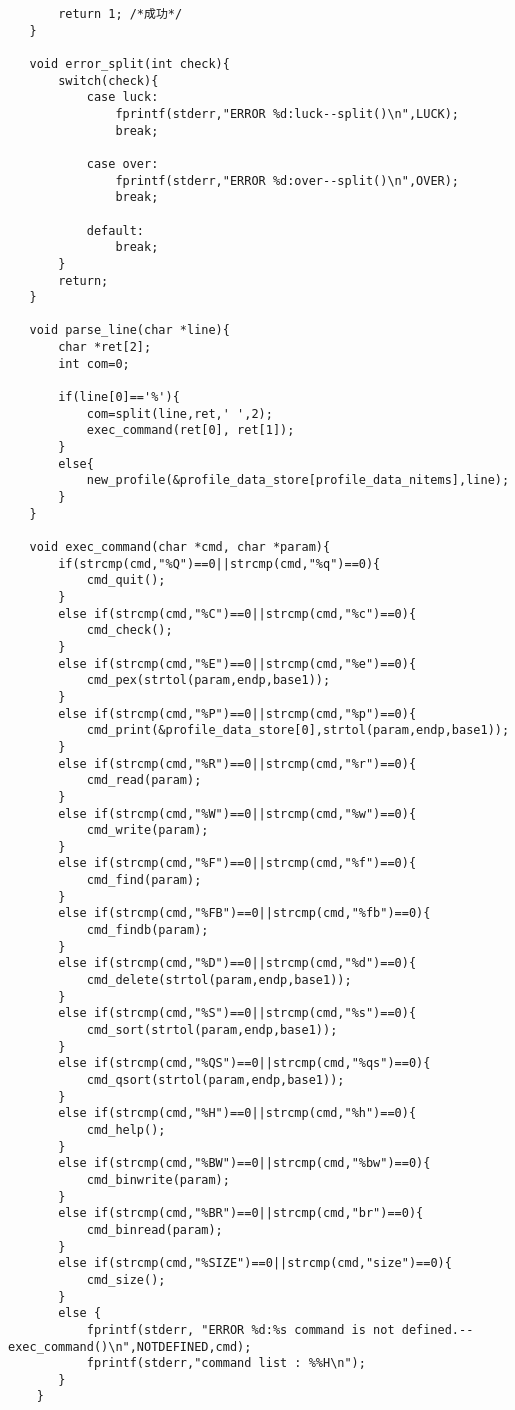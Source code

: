 \documentclass[a4j,11pt]{jarticle}
\begin{document}
\begin{lstlisting}
       return 1; /*成功*/
   }
   
   void error_split(int check){
       switch(check){
           case luck:
               fprintf(stderr,"ERROR %d:luck--split()\n",LUCK);
               break;
           
           case over:
               fprintf(stderr,"ERROR %d:over--split()\n",OVER);
               break;
           
           default:
               break;
       }
       return;
   }
   
   void parse_line(char *line){
       char *ret[2];
       int com=0;
       
       if(line[0]=='%'){
           com=split(line,ret,' ',2);
           exec_command(ret[0], ret[1]);
       }
       else{
           new_profile(&profile_data_store[profile_data_nitems],line);
       }
   }
   
   void exec_command(char *cmd, char *param){
       if(strcmp(cmd,"%Q")==0||strcmp(cmd,"%q")==0){
           cmd_quit();
       }
       else if(strcmp(cmd,"%C")==0||strcmp(cmd,"%c")==0){
           cmd_check();
       }
       else if(strcmp(cmd,"%E")==0||strcmp(cmd,"%e")==0){
           cmd_pex(strtol(param,endp,base1));
       }
       else if(strcmp(cmd,"%P")==0||strcmp(cmd,"%p")==0){
           cmd_print(&profile_data_store[0],strtol(param,endp,base1));
       }
       else if(strcmp(cmd,"%R")==0||strcmp(cmd,"%r")==0){
           cmd_read(param);
       }
       else if(strcmp(cmd,"%W")==0||strcmp(cmd,"%w")==0){
           cmd_write(param);
       }
       else if(strcmp(cmd,"%F")==0||strcmp(cmd,"%f")==0){
           cmd_find(param);
       }
       else if(strcmp(cmd,"%FB")==0||strcmp(cmd,"%fb")==0){
           cmd_findb(param);
       }
       else if(strcmp(cmd,"%D")==0||strcmp(cmd,"%d")==0){
           cmd_delete(strtol(param,endp,base1));
       }
       else if(strcmp(cmd,"%S")==0||strcmp(cmd,"%s")==0){
           cmd_sort(strtol(param,endp,base1));
       }
       else if(strcmp(cmd,"%QS")==0||strcmp(cmd,"%qs")==0){
           cmd_qsort(strtol(param,endp,base1));
       }
       else if(strcmp(cmd,"%H")==0||strcmp(cmd,"%h")==0){
           cmd_help();
       }
       else if(strcmp(cmd,"%BW")==0||strcmp(cmd,"%bw")==0){
           cmd_binwrite(param);
       }
       else if(strcmp(cmd,"%BR")==0||strcmp(cmd,"br")==0){
           cmd_binread(param);
       }
       else if(strcmp(cmd,"%SIZE")==0||strcmp(cmd,"size")==0){
           cmd_size();
       }
       else {
           fprintf(stderr, "ERROR %d:%s command is not defined.--exec_command()\n",NOTDEFINED,cmd);
           fprintf(stderr,"command list : %%H\n");
       }
    }
   

\end{lstlisting}
\end{document}
